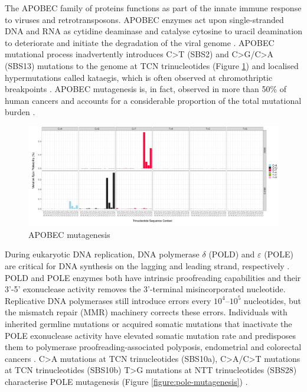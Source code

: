 The APOBEC family of proteins functions as part of the innate immune response to viruses and retrotransposons. APOBEC enzymes act upon single-stranded DNA and RNA as cytidine deaminase and catalyse cytosine to uracil deamination to deteriorate and initiate the degradation of the viral genome \cite{Salter2016-go}. APOBEC mutational process inadvertently introduces C>T (SBS2) and C>G/C>A (SBS13) mutations to the genome at TCN trinucleotides (Figure \ref{figure:apobec-mutagenesis}) \cite{Burns2013-xn} and localised hypermutations called kataegis, which is often observed at chromothriptic breakpoints \cite{Nik-Zainal2012-nz}. APOBEC mutagenesis is, in fact, observed in more than 50\% of human cancers and accounts for a considerable proportion of the total mutational burden \cite{Alexandrov2013-fq}.

\begin{figure}[htbp!]
\caption{APOBEC mutagenesis}
\label{figure:apobec-mutagenesis}
\begin{centering}
\includegraphics[width=1\textwidth]{Vector/SBS2_SBS13_sbs96.pdf}
\end{centering}
\end{figure}

During eukaryotic DNA replication, DNA polymerase $\delta$ (POLD) and $\varepsilon$ (POLE) are critical for DNA synthesis on the lagging and leading strand, respectively \cite{Swan2009-ew, Pursell2007-cu}. POLD and POLE enzymes both have intrinsic proofreading capabilities and their 3’-5’ exonuclease activity removes the 3’-terminal misincorporated nucleotide. Replicative DNA polymerases still introduce errors every $10^4 – 10^5$ nucleotides, but the mismatch repair (MMR) machinery corrects these errors. Individuals with inherited germline mutations or acquired somatic mutations that inactivate the POLE exonuclease activity have elevated somatic mutation rate and predisposes them to polymerase proofreading-associated polyposis, endometrial and colorectal cancers \cite{Palles2013-ua}. C>A mutations at TCN trinucleotides (SBS10a), C>A/C>T mutations at TCN trinucleotides (SBS10b) T>G mutations at NTT trinucleotides (SBS28) characterise POLE mutagenesis (Figure \ref{figure:pole-mutagenesis}) \cite{Robinson2021-te}. 

